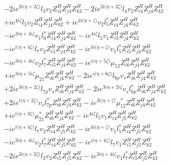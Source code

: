  \begin{align} 
 & -2 i e^{2 i \Big(\eta +2 \zeta \Big)} l_3 v_2 Z_{{i 4}}^{H} Z_{{j 4}}^{H} Z_{{k 2}}^{H} -2 i e^{2 i \Big(\eta +2 \zeta \Big)} l_4 v_2 Z_{{i 4}}^{H} Z_{{j 4}}^{H} Z_{{k 2}}^{H} \nonumber \\ 
 &+i e^{4 i \zeta } l_5 v_2 Z_{{i 4}}^{H} Z_{{j 4}}^{H} Z_{{k 2}}^{H} +i e^{4 i \Big(\eta +\zeta \Big)} v_2 l_5^* Z_{{i 4}}^{H} Z_{{j 4}}^{H} Z_{{k 2}}^{H} \nonumber \\ 
 &-i e^{3 i \eta +4 i \zeta } v_1 l_6^* Z_{{i 4}}^{H} Z_{{j 4}}^{H} Z_{{k 2}}^{H} -i e^{4 i \zeta } l_5 v_1 Z_{{i 5}}^{H} Z_{{j 4}}^{H} Z_{{k 2}}^{H} \nonumber \\ 
 &-i e^{i \Big(\eta +4 \zeta \Big)} l_7 v_2 Z_{{i 5}}^{H} Z_{{j 4}}^{H} Z_{{k 2}}^{H} -i e^{4 i \Big(\eta +\zeta \Big)} v_1 l_5^* Z_{{i 5}}^{H} Z_{{j 4}}^{H} Z_{{k 2}}^{H} \nonumber \\ 
 &-i e^{3 i \eta +4 i \zeta } v_2 l_7^* Z_{{i 5}}^{H} Z_{{j 4}}^{H} Z_{{k 2}}^{H} -i e^{i \Big(\eta +5 \zeta \Big)} \mu_{12} Z_{{i 6}}^{H} Z_{{j 4}}^{H} Z_{{k 2}}^{H} \nonumber \\ 
 &+i e^{3 i \eta +5 i \zeta } \mu_{21} Z_{{i 6}}^{H} Z_{{j 4}}^{H} Z_{{k 2}}^{H} -2 i e^{i \Big(\eta +6 \zeta \Big)} l_{6p} v_s Z_{{i 6}}^{H} Z_{{j 4}}^{H} Z_{{k 2}}^{H} \nonumber \\ 
 &+2 i e^{3 i \Big(\eta +2 \zeta \Big)} l_{7p} v_s Z_{{i 6}}^{H} Z_{{j 4}}^{H} Z_{{k 2}}^{H} -2 i e^{3 i \eta +2 i \zeta } v_s l_{6p}^* Z_{{i 6}}^{H} Z_{{j 4}}^{H} Z_{{k 2}}^{H} \nonumber \\ 
 &+2 i e^{i \Big(\eta +2 \zeta \Big)} v_s l_{7p}^* Z_{{i 6}}^{H} Z_{{j 4}}^{H} Z_{{k 2}}^{H} -i e^{3 i \Big(\eta +\zeta \Big)} \mu_{12}^* Z_{{i 6}}^{H} Z_{{j 4}}^{H} Z_{{k 2}}^{H} \nonumber \\ 
 &+i e^{i \Big(\eta +3 \zeta \Big)} \mu_{21}^* Z_{{i 6}}^{H} Z_{{j 4}}^{H} Z_{{k 2}}^{H} -i e^{4 i \zeta } l_5 v_1 Z_{{i 4}}^{H} Z_{{j 5}}^{H} Z_{{k 2}}^{H} \nonumber \\ 
 &-i e^{i \Big(\eta +4 \zeta \Big)} l_7 v_2 Z_{{i 4}}^{H} Z_{{j 5}}^{H} Z_{{k 2}}^{H} -i e^{4 i \Big(\eta +\zeta \Big)} v_1 l_5^* Z_{{i 4}}^{H} Z_{{j 5}}^{H} Z_{{k 2}}^{H} \nonumber \\ 
 &-i e^{3 i \eta +4 i \zeta } v_2 l_7^* Z_{{i 4}}^{H} Z_{{j 5}}^{H} Z_{{k 2}}^{H} -i e^{i \Big(\eta +4 \zeta \Big)} l_7 v_1 Z_{{i 5}}^{H} Z_{{j 5}}^{H} Z_{{k 2}}^{H} \nonumber \\ 
 &-2 i e^{2 i \Big(\eta +2 \zeta \Big)} l_2 v_2 Z_{{i 5}}^{H} Z_{{j 5}}^{H} Z_{{k 2}}^{H} -i e^{3 i \eta +4 i \zeta } v_1 l_7^* Z_{{i 5}}^{H} Z_{{j 5}}^{H} Z_{{k 2}}^{H} \nonumber \\ 

\end{align}
